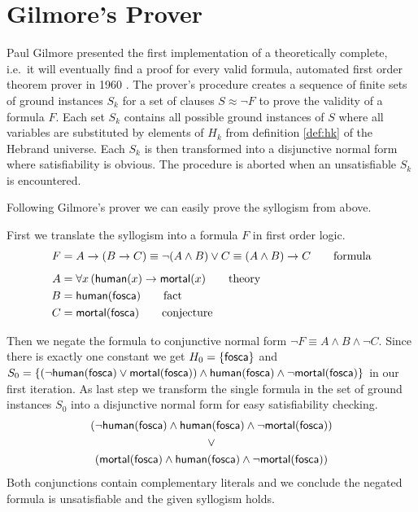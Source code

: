 \section{Gilmore's Prover}

Paul Gilmore presented the first {\myem implementation} of a theoretically complete, i.e.~it will eventually find a proof for every valid formula,  automated first order theorem prover in 1960 \cite{5392528}.
%
The prover's procedure 
creates a sequence of finite sets of ground instances $S_k$ 
for a set of clauses $S\approx\lnot F$ to prove the validity of a formula $F$.
Each set $S_k$ contains all possible ground instances of $S$ 
where all variables are substituted by elements of $H_k$
from definition \ref{def:hk} of the Hebrand universe.
Each $S_k$ is then transformed into a disjunctive normal form where satisfiability is obvious.
The procedure is aborted when an unsatisfiable $S_k$ is encountered.

Following Gilmore's prover we can easily prove the syllogism from above.

\begin{example}\label{ex:syllo}
	First we translate the syllogism into a formula $F$ in first order logic.
	\begin{align*}
		F &= A \rightarrow (B \rightarrow C) \equiv \lnot(A\land B) \lor C \equiv (A\land B)\rightarrow C  
		\tag*{formula}
		\\[0.5em]
		A &= \forall x\, ( \mathsf{human}(x) \rightarrow \mathsf{mortal}(x) 
		\tag*{theory}
		\\
		B &= \mathsf{human}(\mathsf{fosca}) 
		\tag*{fact}
		\\
		C &= \mathsf{mortal}(\mathsf{fosca})
		\tag*{conjecture}
	\end{align*}
 


	Then we negate the formula to conjunctive normal form $\lnot F \equiv A\land B \land\lnot C$.
	Since there is exactly one constant we get
	$H_0 = \{ \mathsf{fosca} \}$ and 
	$S_0 = 
	\{
	(\lnot\mathsf{human}(\mathsf{fosca})\lor\mathsf{mortal}(\mathsf{fosca}))\land\mathsf{human}(\mathsf{fosca})\land\lnot\mathsf{mortal}(\mathsf{fosca})
	\}$ in our first iteration. 
	As last step we transform the single formula in 
	the set of ground instances $S_0$ into a disjunctive normal form 
	for easy satisfiability checking.
%
\begin{gather*}
(\lnot\mathsf{human}(\mathsf{fosca})\land\mathsf{human}(\mathsf{fosca})\land\lnot\mathsf{mortal}(\mathsf{fosca}))
\\ 
\lor
\\ 
(\mathsf{mortal}(\mathsf{fosca})\land\mathsf{human}(\mathsf{fosca})\land\lnot\mathsf{mortal}(\mathsf{fosca}))
\end{gather*}
Both conjunctions contain complementary literals and we conclude the negated formula is unsatisfiable
 and the given syllogism holds.
 
\end{example}

